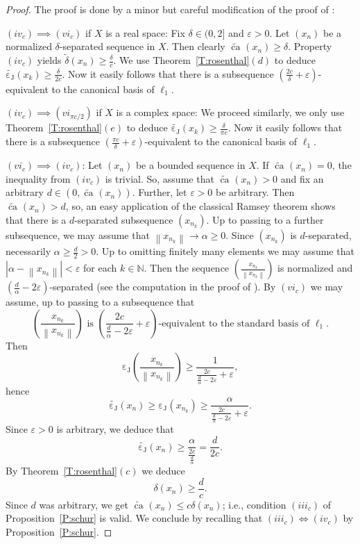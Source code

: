 \documentclass{amsart}
\numberwithin{equation}{section}
\theoremstyle{definition}
\def\en{\mathbb N}
\def\iff{\Longleftrightarrow}
\def\wde#1{\widetilde{\delta}\left(#1\right)}
\def\de#1{\delta\left(#1\right)}
\def\cj#1{\operatorname{\varepsilon_J}\left(#1\right)}
\def\dcj#1{\widetilde{\operatorname{\varepsilon_J}}\left(#1\right)}
\newcommand{\norm}[1]{\left\|#1\right\|}
\newcommand{\wca}[2][]{\widetilde{\operatorname{ca}}_{#1}\left(#2\right)}
\newcommand{\abs}[1]{\left|#1\right|}
\begin{document}
\begin{proof}  The proof is done by a minor but careful modification of the proof of \cite[Proposition 4.1]{qschur}:

$(iv_c)\implies(vi_c)$ if $X$ is a real space: Fix $\delta\in(0,2]$ and $\varepsilon>0$. Let $(x_n)$ be a normalized $\delta$-separated sequence in $X$. Then clearly $\wca{x_n}\ge\delta$. Property $(iv_c)$ yields $\wde{x_n}\ge\frac\delta c$. We use Theorem~\ref{T:rosenthal}$(d)$ to deduce $\dcj{x_k}\ge \frac{\delta}{2c}$. Now it easily follows that there is a subsequence $(\frac{2c}\delta+\varepsilon)$-equivalent to the canonical basis of $\ell_1$.

$(iv_c)\implies (vi_{\pi c/2})$ if $X$ is a complex space: We proceed similarly, we only use
 Theorem~\ref{T:rosenthal}$(e)$ to deduce $\dcj{x_k}\ge \frac{\delta}{\pi c}$. Now it easily follows that there is a subsequence $(\frac{\pi c}\delta+\varepsilon)$-equivalent to the canonical basis of $\ell_1$.

$(vi_c)\implies (iv_c)$: Let $(x_n)$ be a bounded sequence in $X$. If $\wca{x_n}=0$, the inequality from $(iv_c)$ is trivial. So, assume that $\wca{x_n}>0$ and fix an arbitrary $d\in (0,\wca{x_n})$. Further, let $\varepsilon>0$ be arbitrary. Then $\wca{x_n}>d$, so, an easy application of the classical Ramsey theorem shows that there is a $d$-separated subsequence $(x_{n_k})$.
Up to passing to a further subsequence, we may assume that $\norm{x_{n_k}}\to \alpha \ge0$. Since $(x_{n_k})$ is $d$-separated, necessarily $\alpha\ge \frac d2>0$. Up to omitting finitely many elements we may assume that $\abs{\alpha-\norm{x_{n_k}}}<\varepsilon$  for each $k\in\en$. Then the sequence $\left(\frac{x_{n_k}}{\norm{x_{n_k}}}\right)$ is normalized and $(\frac d\alpha-2\varepsilon)$-separated (see the computation in the proof of \cite[Proposition 4.1]{qschur}). By $(vi_c)$ we may assume, up to passing to a subsequence that
$$\left(\frac{x_{n_k}}{\norm{x_{n_k}}}\right) \mbox{ is }\left(\frac {2c}{\frac d\alpha-2\varepsilon}+\varepsilon\right)\mbox{-equivalent to the standard basis of }\ell_1.$$ 
Then
$$\cj{\frac{x_{n_k}}{\norm{x_{n_k}}}}\ge\frac{1}{\frac {2c}{\frac d\alpha-2\varepsilon}+\varepsilon},$$
hence
$$\dcj{x_n}\ge \cj{x_{n_k}}\ge\frac{\alpha}{\frac {2c}{\frac d\alpha-2\varepsilon}+\varepsilon}.$$
Since $\varepsilon>0$ is arbitrary, we deduce that
$$\dcj{x_n}\ge \frac{\alpha}{\frac {2c}{\frac d\alpha}}=\frac d{2c}.$$
By Theorem~\ref{T:rosenthal}$(c)$ we deduce
$$\de{x_n}\ge \frac dc.$$
Since $d$ was arbitrary, we get $\wca{x_n}\le c\de{x_n}$; i.e., condition $(iii_c)$ of Proposition~\ref{P:schur} is valid. We conclude by recalling that $(iii_c)\iff (iv_c)$ by Proposition~\ref{P:schur}.
\end{proof}
\end{document}
